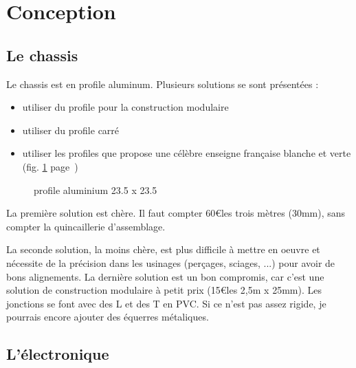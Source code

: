 \section{Conception}
\subsection{Le chassis}
Le chassis est en profile aluminum. Plusieurs solutions se sont %
présentées :\begin{itemize}%
\item{utiliser du profile pour la construction modulaire}%
\item{utiliser du profile carré}%
\item{utiliser les profiles que propose une célèbre enseigne française %
blanche et verte (fig. \ref{profile} page~\pageref{profile})}
\end{itemize}%
\begin{figure}
   \caption{\label{profile} profile aluminium 23.5 x 23.5}
\end{figure}
La première solution est chère. Il faut compter 60\euro les trois mètres %
(30mm), sans compter la quincaillerie d'assemblage. \par%
La seconde solution, la moins chère, est plus difficile à mettre en %
oeuvre et nécessite de la précision dans les usinages (perçages, sciages, %
...) pour avoir de bons alignements.%
La dernière solution est un bon compromis, car c'est une solution de %
construction modulaire à petit prix (15\euro les 2,5m x 25mm). Les jonctions %
se font avec des L et des T en PVC. Si ce n'est pas assez rigide, je %
pourrais encore ajouter des équerres métaliques.
\subsection{L'électronique}
